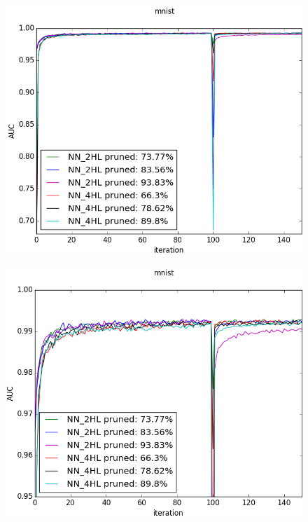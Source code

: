 \documentclass{article} %
\begin{document}
\begin{figure}
\centering
\begin{minipage}{.49\textwidth}
\centering
\includegraphics[width=\linewidth]{mnist2.png}
\label{f:results1}
\end{minipage}
\hfill
\begin{minipage}{.49\textwidth}
\centering
\includegraphics[width=\linewidth]{mnist.png}
\label{f:results2}
\end{minipage}
\end{figure}
\end{document}
